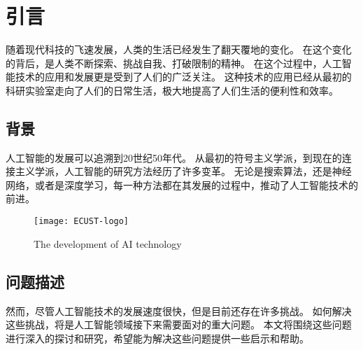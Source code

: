 \section{引言}\label{sec:introduction}
随着现代科技的飞速发展，人类的生活已经发生了翻天覆地的变化。
在这个变化的背后，是人类不断探索、挑战自我、打破限制的精神。
在这个过程中，人工智能技术的应用和发展更是受到了人们的广泛关注\cite{smith2020online, brown2021, jones2021}。
这种技术的应用已经从最初的科研实验室走向了人们的日常生活，极大地提高了人们生活的便利性和效率\cite{smith2020}。

\subsection{背景}\label{subsec:background}
人工智能的发展可以追溯到20世纪50年代。
从最初的符号主义学派，到现在的连接主义学派，人工智能的研究方法经历了许多变革。
无论是搜索算法，还是神经网络，或者是深度学习，每一种方法都在其发展的过程中，推动了人工智能技术的前进\cite{smith2020, lee2021, anderson2020}。

\begin{figure}[ht]
    \centering
    \texttt{[image: ECUST-logo]}
    \caption{The development of AI technology}
    \label{fig:ai-development}
\end{figure}

\subsection{问题描述}\label{subsec:problem-description}
然而，尽管人工智能技术的发展速度很快，但是目前还存在许多挑战。
如何解决这些挑战，将是人工智能领域接下来需要面对的重大问题\cite{jones2021, thomas2020, iso2000, davis2020}。
本文将围绕这些问题进行深入的探讨和研究，希望能为解决这些问题提供一些启示和帮助\cite{brown2021, johnson2019}。
